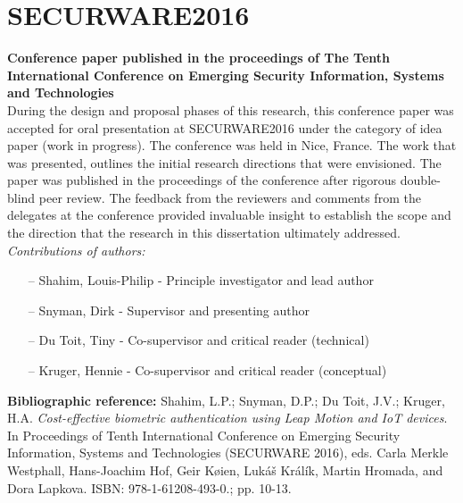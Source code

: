 
\chapter{SECURWARE2016}
\label{AppendixA}
\textbf{Conference paper published in the proceedings of The Tenth International Conference on Emerging Security Information, Systems and Technologies} \\


During the design and proposal phases of this research, this conference paper was accepted for oral presentation at SECURWARE2016 under the category of idea paper (work in progress). The conference was held in Nice, France. The work that was presented, outlines the initial research directions that were envisioned. The paper was published in the proceedings of the conference after rigorous double-blind peer review. The feedback from the reviewers and comments from the delegates at the conference provided invaluable insight to establish the scope and the direction that the research in this dissertation ultimately addressed.\\

\textit{Contributions of authors:}
\begin{itemize}
\item[--] Shahim, Louis-Philip - Principle investigator and lead author
\item[--] Snyman, Dirk - Supervisor and presenting author
\item[--] Du Toit, Tiny - Co-supervisor and critical reader (technical)
\item[--] Kruger, Hennie - Co-supervisor and critical reader (conceptual)
\end{itemize}

\textbf{Bibliographic reference:} Shahim, L.P.; Snyman, D.P.; Du Toit, J.V.; Kruger, H.A. \textit{Cost-effective biometric authentication using Leap Motion and IoT devices}. In Proceedings of Tenth International Conference on Emerging Security Information, Systems and Technologies (SECURWARE 2016), eds. Carla Merkle Westphall, Hans-Joachim Hof, Geir Køien, Lukáš Králík, Martin Hromada, and Dora Lapkova. ISBN: 978-1-61208-493-0.; pp. 10-13.


